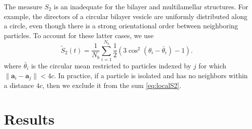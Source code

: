 \documentclass[aps,prl,preprint,groupedaddress]{revtex4-2}
\renewcommand{\aa}{\mathbf{a}}
\begin{document}
The measure $S_2$ is an inadequate for the bilayer and
multilamellar structures.  For example, the directors of a circular
bilayer vesicle are uniformly distributed along a circle, even though
there is a strong orientational order between neighboring particles.
To account for these latter cases, we use
\begin{equation}
  \label{eq:localS2}
\tilde{S}_2(t) = \frac{1}{N_b} \sum_{i=1}^{N_b}
\frac{1}{2}(3\cos^2(\theta_i - \bar \theta_i) - 1).
\end{equation}
where $\bar \theta_i$ is the circular mean restricted to particles
indexed by $j$ for which $\|\aa_i - \aa_j\| < 4c$. In practice, if a particle is
isolated and has no neighbors within a distance $4c$, then we exclude it from
the sum \eqref{eq:localS2}. 

\section{Results}
\label{sec:results}
\end{document}
